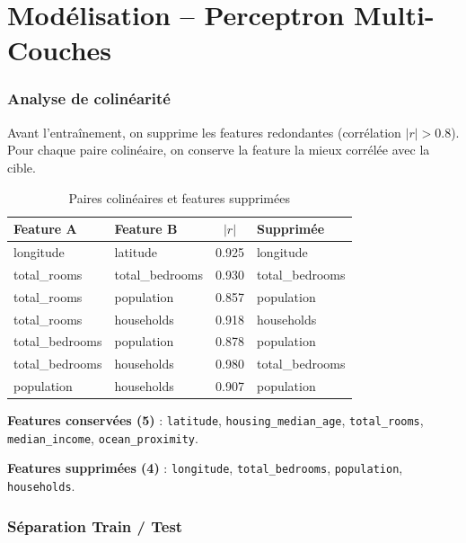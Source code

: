 \documentclass[a4paper,11pt]{article}
\begin{document}
\part{Mod\'elisation -- Perceptron Multi-Couches}

\section{Analyse de colin\'earit\'e}

Avant l'entra\^inement, on supprime les features redondantes (corr\'elation $|r| > 0.8$). Pour chaque paire colin\'eaire, on conserve la feature la mieux corr\'el\'ee avec la cible.

\begin{table}[h]
\centering
\begin{tabular}{llcl}
\toprule
\textbf{Feature A} & \textbf{Feature B} & $|r|$ & \textbf{Supprim\'ee} \\
\midrule
longitude      & latitude        & 0.925 & longitude \\
total\_rooms   & total\_bedrooms & 0.930 & total\_bedrooms \\
total\_rooms   & population      & 0.857 & population \\
total\_rooms   & households      & 0.918 & households \\
total\_bedrooms & population     & 0.878 & population \\
total\_bedrooms & households     & 0.980 & total\_bedrooms \\
population     & households      & 0.907 & population \\
\bottomrule
\end{tabular}
\caption{Paires colin\'eaires et features supprim\'ees}
\end{table}

\textbf{Features conserv\'ees (5)} : \texttt{latitude}, \texttt{housing\_median\_age}, \texttt{total\_rooms}, \texttt{median\_income}, \texttt{ocean\_proximity}.

\textbf{Features supprim\'ees (4)} : \texttt{longitude}, \texttt{total\_bedrooms}, \texttt{population}, \texttt{households}.

\section{S\'eparation Train / Test}
\end{document}
